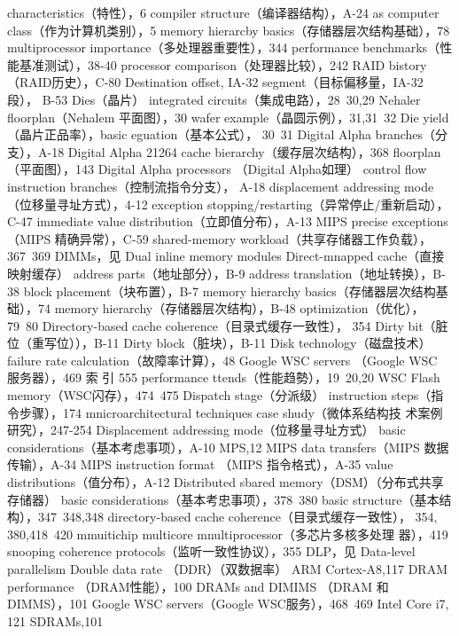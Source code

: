 characteristics（特性），6
compiler structure（编译器结构），A-24
as computer class（作为计算机类别），5
memory hierarcby basics（存储器层次结构基础），78
multiprocessor importance（多处理器重要性），344
performance benchmarks（性能基准测试），38-40
processor comparison（处理器比较），242
RAID bistory （RAID历史），C-80
Destination offset, IA-32 segment（目标偏移量，IA-32段），
B-53
Dies（晶片）
integrated circuits（集成电路），28~30,29
Nehaler floorplan（Nehalem 平面图），30
wafer example（晶圆示例），31,31~32
Die yield（晶片正品率），basic eguation（基本公式），
30~31
Digital Alpha
branches（分支），A-18
Digital Alpha 21264
cache bierarchy（缓存层次结构），368
floorplan（平面图），143
Digital Alpha processors （Digital Alpha如理）
control flow instruction branches（控制流指令分支），
A-18
displacement addressing mode（位移量寻址方式），4-12
exception stopping/restarting（异常停止/重新启动），
C-47
immediate value distribution（立即值分布），A-13
MIPS precise exceptions （MIPS 精确异常），C-59
shared-memory workload（共享存储器工作负载），
367~369
DIMMs，见 Dual inline memory modules
Direct-mnapped cache（直接映射缓存）
address parts（地址部分），B-9
address translation（地址转换），B-38
block placement（块布置），B-7
memory hierarchy basics（存储器层次结构基础），74
memory hierarchy（存储器层次结构），B-48
optimization（优化），79~80
Directory-based cache coherence（目录式缓存一致性），
354
Dirty bit（脏位（重写位）），B-11
Dirty block（脏块），B-11
Disk technology（磁盘技术）
failure rate calculation（故障率计算），48
Google WSC servers （Google WSC 服务器），469
索
引
555
performance ttends（性能趋勢），19~20,20
WSC Flash memory（WSC闪存），474~475
Dispatch stage（分派级）
instruction steps（指令步骤），174
mnicroarchitectural techniques case shudy（微体系结构技
术案例研究），247-254
Displacement addressing mode（位移量寻址方式）
basic considerations（基本考虑事项），A-10
MPS,12
MIPS data transfers（MIPS 数据传输），A-34
MIPS instruction format （MIPS 指令格式），A-35
value distributions（值分布），A-12
Distributed sbared memory（DSM）（分布式共享存储器）
basic considerations（基本考忠事项），378~380
basic structure（基本结构），347~348,348
directory-based cache coherence（目录式缓存一致性），
354, 380,418~420
mmuitichip multicore mnultiprocessor（多芯片多核多处理
器），419
snooping coherence protocols（监听一致性协议），355
DLP，见 Data-level parallelism
Double data rate （DDR）（双数据率）
ARM Cortex-A8,117
DRAM performance （DRAM性能），100
DRAMs and DIMIMS （DRAM 和 DIMMS），101
Google WSC servers（Google WSC服务），468~469
Intel Core i7, 121
SDRAMs,101
